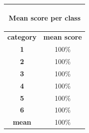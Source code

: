 \documentclass[c]{beamer}
\begin{document}
\begin{frame}
\begin{columns}
\begin{column}{0.5\textwidth}
\begin{overlayarea}{\linewidth}{2cm}
\begin{table}
\begin{center}
\begin{adjustbox}{max width=0.4\textwidth}
{\begin{tabular}{|c|c|}
      \multicolumn{2}{|c|}{\begin{bf}Mean score per class\end{bf}} \\
      \hline
      \textbf{category} & \textbf{mean score}\\
      \hline
      \textbf{1} & 100\% \\
      \hline
      \textbf{2} & 100\% \\
      \hline
      \textbf{3} & 100\% \\
      \hline
      \textbf{4} & 100\% \\
      \hline
      \textbf{5} & 100\% \\
      \hline
      \textbf{6} & 100\% \\
      \hline
      \textbf{mean} & 100\% \\
      \hline
    \end{tabular}
    }
    \end{adjustbox}
    \end{center}
  \end{table}
  \end{overlayarea}
\end{column}
\end{columns}
\end{frame}
\end{document}
